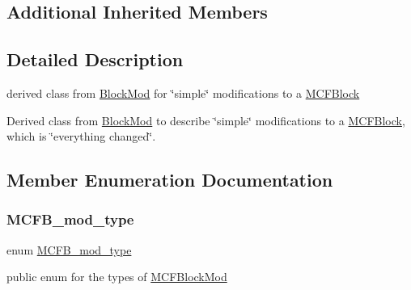 \subsection*{Additional Inherited Members}


\subsection{Detailed Description}
derived class from \mbox{\hyperlink{class_s_m_spp__di__unipi__it_1_1_block_mod}{Block\+Mod}} for \char`\"{}simple\char`\"{} modifications to a \mbox{\hyperlink{class_s_m_spp__di__unipi__it_1_1_m_c_f_block}{M\+C\+F\+Block}} 

Derived class from \mbox{\hyperlink{class_s_m_spp__di__unipi__it_1_1_block_mod}{Block\+Mod}} to describe \char`\"{}simple\char`\"{} modifications to a \mbox{\hyperlink{class_s_m_spp__di__unipi__it_1_1_m_c_f_block}{M\+C\+F\+Block}}, which is \char`\"{}everything changed\char`\"{}. 

\subsection{Member Enumeration Documentation}
\mbox{\label{class_s_m_spp__di__unipi__it_1_1_m_c_f_block_mod_a2495592a9f6d30d8981d82fea84c23ef}} 
\subsubsection{\texorpdfstring{M\+C\+F\+B\+\_\+mod\+\_\+type}{MCFB\_mod\_type}}
{\footnotesize\ttfamily enum \mbox{\hyperlink{class_s_m_spp__di__unipi__it_1_1_m_c_f_block_mod_a2495592a9f6d30d8981d82fea84c23ef}{M\+C\+F\+B\+\_\+mod\+\_\+type}}}



public enum for the types of \mbox{\hyperlink{class_s_m_spp__di__unipi__it_1_1_m_c_f_block_mod}{M\+C\+F\+Block\+Mod}} 

